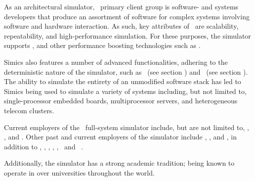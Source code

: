 \noindent
As an architectural simulator, \dvttermsimics\ primary client group is software- and systems developers that produce an assortment of software for complex systems involving software and hardware interaction.
As such, key attributes of \dvttermsimics\ are scalability, repeatability, and high-performance simulation.
For these purposes, the simulator supports \dvttermhostvirtualizationextensions , and other performance boosting technologies such as \dvttermhypersimulation {}.

Simics also features a number of advanced functionalities, adhering to the deterministic nature of the simulator, such as \dvttermcheckpointing\ (see section ) and \dvttermreverseexecution\ (see section ).\\

\noindent
The ability to simulate the entirety of an unmodified software stack has led to Simics being used to simulate a variety of systems including, but not limited to, single-processor embedded boards, multiprocessor servers, and heterogeneous telecom clusters.

Current employers of the \dvttermsimics\ full-system simulator include, but are not limited to, \dvttermibm {}, \dvttermnasa {}, and \dvttermintel {}.
Other past and current employers of the simulator include \dvttermsunmicrosystems , \dvttermericsson , and \dvttermhewlettpackard {}, in addition to \dvttermcisco , \dvttermfreescalesemiconductor , \dvttermgeavionics , \dvttermhoneywell , \dvttermlockheedmartin , \dvttermnortel\ and \dvttermnorthropgrumman\ .

Additionally, the simulator has a strong academic tradition; being known to operate in over  universities throughout the world.

